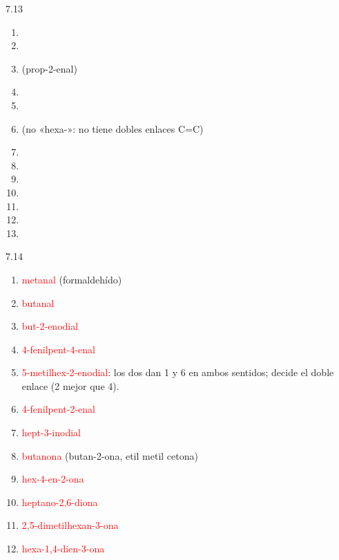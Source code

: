 \begin{Solution}{7.13}
        \begin{enumerate}[label=\alph*)]
            \item {}
            \item {}
            \item {} (prop-2-enal)
            \item {}
            \item {}
            \item {} (no «hexa-»: no tiene dobles enlaces C=C)
            \item {}
            \item {}
            \item {}
            \item {}
            \item {}
            \item {}
            \item {}
        \end{enumerate}
    
\end{Solution}
\begin{Solution}{7.14}
        \begin{enumerate}[label=\alph*)]
            \item \textcolor{red}{metanal} (formaldehído)
            \item \textcolor{red}{butanal}
            \item \textcolor{red}{but-2-enodial}
            \item \textcolor{red}{4-fenilpent-4-enal}
            \item \textcolor{red}{5-metilhex-2-enodial}: los dos  dan 1 y 6 en ambos sentidos; decide el doble enlace (2 mejor que 4).
            \item \textcolor{red}{4-fenilpent-2-enal}
            \item \textcolor{red}{hept-3-inodial}
            \item \textcolor{red}{butanona} (butan-2-ona, etil metil cetona)
            \item \textcolor{red}{hex-4-en-2-ona}
            \item \textcolor{red}{heptano-2,6-diona}
            \item \textcolor{red}{2,5-dimetilhexan-3-ona}
            \item \textcolor{red}{hexa-1,4-dien-3-ona}
        \end{enumerate}
    
\end{Solution}
